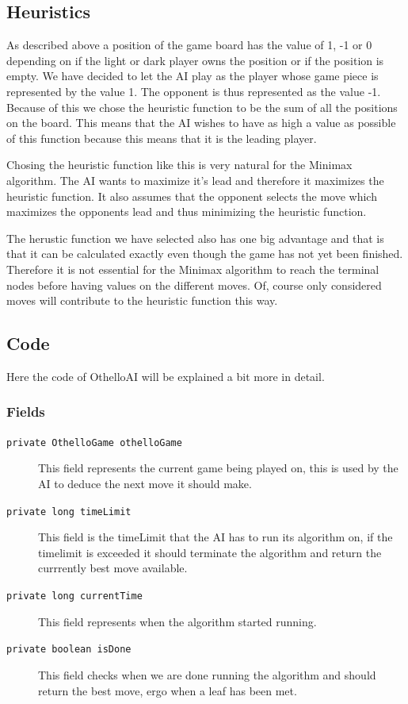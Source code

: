 \documentclass[a4paper]{article}
\begin{document}
\subsection{Heuristics}
As described above a position of the game board has the value of 1, -1 or 0 depending on if the light or dark player owns the position or if the position is empty. We have decided to let the AI play as the player whose game piece is represented by the value 1. The opponent is thus represented as the value -1. Because of this we chose the heuristic function to be the sum of all the positions on the board. This means that the AI wishes to have as high a value as possible of this function because this means that it is the leading player.

Chosing the heuristic function like this is very natural for the Minimax algorithm. The AI wants to maximize it's lead and therefore it maximizes the heuristic function. It also assumes that the opponent selects the move which maximizes the opponents lead and thus minimizing the heuristic function.

The herustic function we have selected also has one big advantage and that is that it can be calculated exactly even though the game has not yet been finished. Therefore it is not essential for the Minimax algorithm to reach the terminal nodes before having values on the different moves. Of, course only considered moves will contribute to the heuristic function this way.

\subsection{Code}
Here the code of OthelloAI will be explained a bit more in detail. 

\subsubsection{Fields}
\begin{description}
\item[\texttt{private OthelloGame othelloGame}] This field represents the current game being played on, this is used by the AI to deduce the next move it should make. 
\item[\texttt{private long timeLimit}] This field is the timeLimit that the AI has to run its algorithm on, if the timelimit is exceeded it should terminate the algorithm and return the currrently best move available.
\item[\texttt{private long currentTime}] This field represents when the algorithm started running.
\item[\texttt{private boolean isDone}] This field checks when we are done running the algorithm and should return the best move, ergo when a leaf has been met.
\end{description} 
\end{document}

